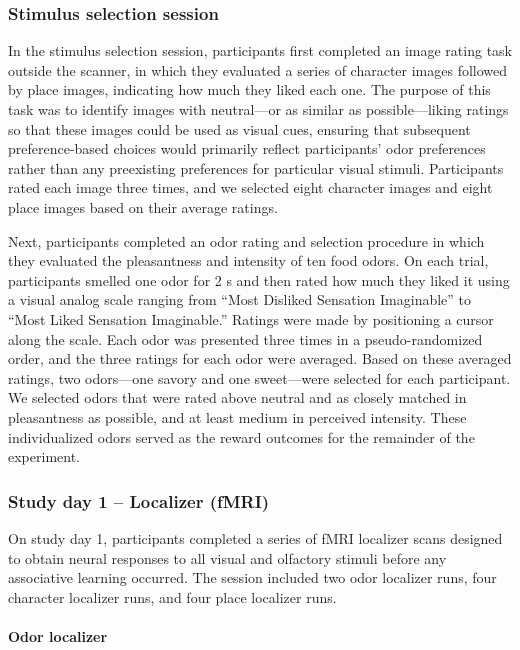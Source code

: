 \documentclass[12pt,letterpaper]{article}
\begin{document}
\subsubsection*{Stimulus selection session}

In the stimulus selection session, participants first completed an image rating task outside the scanner, in which they evaluated a series of character images followed by place images, indicating how much they liked each one. The purpose of this task was to identify images with neutral---or as similar as possible---liking ratings so that these images could be used as visual cues, ensuring that subsequent preference-based choices would primarily reflect participants' odor preferences rather than any preexisting preferences for particular visual stimuli. Participants rated each image three times, and we selected eight character images and eight place images based on their average ratings.


Next, participants completed an odor rating and selection procedure in which they evaluated the pleasantness and intensity of ten food odors. On each trial, participants smelled one odor for 2 s and then rated how much they liked it using a visual analog scale ranging from “Most Disliked Sensation Imaginable” to “Most Liked Sensation Imaginable.” Ratings were made by positioning a cursor along the scale. Each odor was presented three times in a pseudo-randomized order, and the three ratings for each odor were averaged. Based on these averaged ratings, two odors—one savory and one sweet—were selected for each participant. We selected odors that were rated above neutral and as closely matched in pleasantness as possible, and at least medium in perceived intensity. These individualized odors served as the reward outcomes for the remainder of the experiment.


\subsubsection*{Study day 1 – Localizer (fMRI)}

On study day 1, participants completed a series of fMRI localizer scans designed to obtain neural responses to all visual and olfactory stimuli before any associative learning occurred. The session included two odor localizer runs, four character localizer runs, and four place localizer runs.


\paragraph*{Odor localizer}
\end{document}
